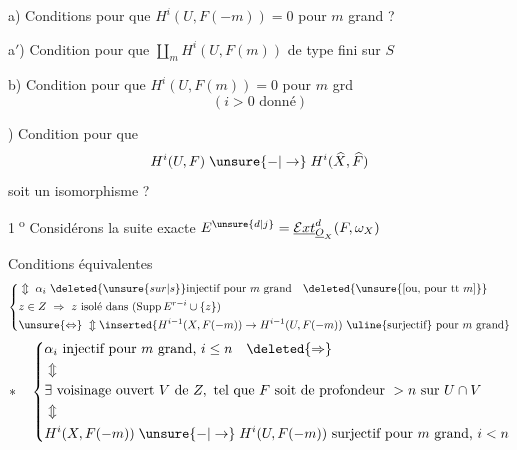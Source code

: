
a) Conditions pour que $H^i(U,F(-m))=0$ pour $m$ grand ?

a$'$) Condition pour que $\coprod_m H^i(U,F(m))$ de type fini sur $S$

b) Condition pour que $H^i(U,F(m))=0$ pour $m$ grd
\[
(i>0\text{ donné})
\]

) Condition pour que
\[
H^i(U,F)\mathrel{\unsure{-|\to}}H^i(\widehat X,\widehat F)
\]
soit un isomorphisme ?

\textcircled{\scriptsize 1\textsuperscript{o}} Considérons la suite exacte  $E^{\unsure{d|j}}=\underline{\mathcal{E}xt}^{d}_{\underline O_X}(F,\omega_X)$


Conditions équivalentes
\[
\left\{\begin{aligned}
&\Updownarrow\ \alpha_i\ \deleted{\unsure{sur|s}}\text{injectif pour }m\text{ grand}\quad\deleted{\unsure{[\text{ou, pour tt }m]}}\\
&z\in Z\ \Rightarrow\ z\text{ isolé dans }(\operatorname{Supp} E^{r-i}\cup\{z\})\\
&\unsure{\Leftrightarrow}\ \Updownarrow
\inserted{H^{i-1}(X,F(-m))\to H^{i-1}(U,F(-m))\ \text{\uline{surjectif} pour }m\text{ grand}}
\end{aligned}\right.
\]
\[
*\quad\left\{\begin{aligned}
&\alpha_i\text{ injectif pour }m\text{ grand, }i\leq n\quad\deleted{\Rightarrow}\\
&\Updownarrow\\
&\exists\ \text{voisinage ouvert }V\text{ de }Z,\text{ tel que }F\text{ soit de profondeur }>n\text{ sur }U\cap V\\
&\Updownarrow\\
&H^i(X,F(-m))\mathrel{\unsure{-|\to}}H^i(U,F(-m))\ \text{surjectif pour }m\text{ grand, }i<n
\end{aligned}\right.
\]
